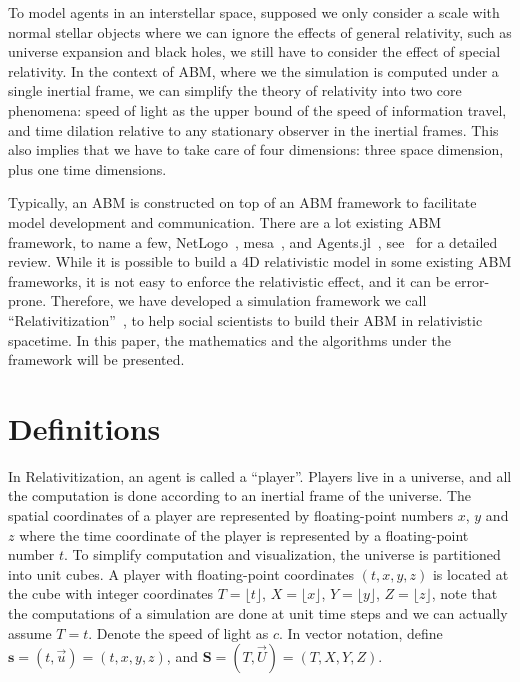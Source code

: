 \documentclass{article}
\begin{document}
To model agents in an interstellar space, supposed we only consider a scale with normal stellar objects
where we can ignore the effects of general relativity, such as universe expansion and black holes,
we still have to consider the effect of special relativity.
In the context of ABM, where we the simulation is computed under a single inertial frame,
we can simplify the theory of relativity into two core
phenomena: speed of light as the upper bound of the speed of information travel, and
time dilation relative to any stationary observer in the inertial frames.
This also implies that we have to take care of four dimensions: three space dimension, plus one time dimensions.

Typically, an ABM is constructed on top of an ABM framework to facilitate model development and communication.
There are a lot existing ABM framework, to name a few, NetLogo~\cite{netlogo}, mesa~\cite{python-mesa-2020},
and Agents.jl~\cite{Agents2021}, see~\cite{pal2020review} for a detailed review.
While it is possible to build a 4D relativistic model in some existing ABM frameworks, it is not easy to
enforce the relativistic effect, and it can be error-prone.
Therefore, we have developed a simulation framework we call ``Relativitization''~\cite{relativitization},
to help social scientists to build their ABM in relativistic spacetime.
In this paper, the mathematics and the algorithms under the framework will be presented.

\section{Definitions}

In Relativitization, an agent is called a ``player''.
Players live in a universe, and all the computation is done according to an inertial frame of the universe.
The spatial coordinates of a player are represented by floating-point numbers $x$, $y$ and $z$
where the time coordinate of the player is represented by a floating-point number $t$.
To simplify computation and visualization, the universe is partitioned into unit cubes.
A player with floating-point coordinates $(t, x, y, z)$ is located at the cube 
with integer coordinates $T = \lfloor t \rfloor$, $X = \lfloor x \rfloor$, $Y = \lfloor y \rfloor$, $Z = \lfloor z \rfloor$,
note that the computations of a simulation are done at unit time steps and we can actually assume $T = t$.
Denote the speed of light as $c$.
In vector notation, define $\textbf{s} = (t, \overrightarrow{u}) = (t, x, y, z)$, and 
$\textbf{S} = (T, \overrightarrow{U}) = (T, X, Y, Z)$.
\end{document}
